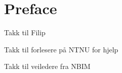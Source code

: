 \chapter*{Preface}

Takk til Filip

Takk til forlesere på NTNU for hjelp

Takk til veiledere fra NBIM

\newpage